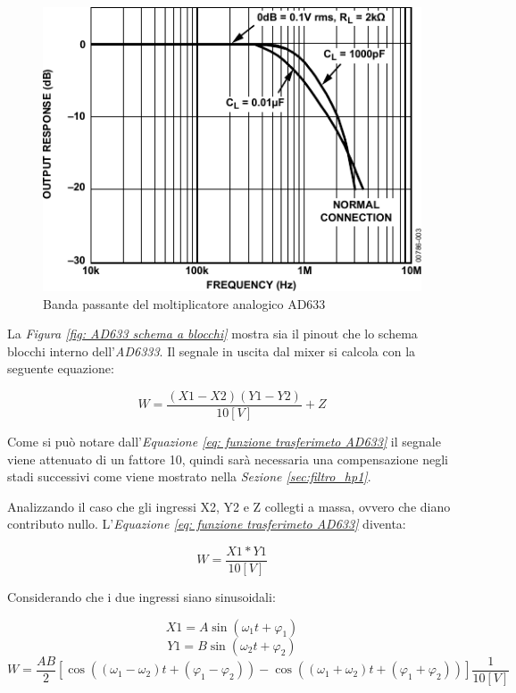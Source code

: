 \documentclass[titlepage]{report}
\begin{document}
	\begin{figure}[H]
		\centering
		\includegraphics[scale=1]{Immagini/ad633_bp.pdf}
		\caption{Banda passante del moltiplicatore analogico AD633}
		\label{fig:sch_ad633}
	\end{figure}

	
	\noindent La \textit{Figura \ref{fig: AD633 schema a blocchi}} mostra sia il pinout che lo schema  blocchi interno dell'\textit{AD6333}. Il segnale in uscita dal mixer si calcola con la seguente equazione:

	\begin{equation}
		\label{eq: funzione trasferimeto AD633}
		W = \frac{(X1 - X2)(Y1 - Y2)}{10 [V]}  + Z 
	\end{equation}

	Come si può notare dall'\textit{Equazione \ref{eq: funzione trasferimeto AD633}} il segnale viene attenuato di un fattore 10, quindi sarà necessaria una compensazione negli stadi successivi come viene mostrato nella \textit{Sezione \ref{sec:filtro_hp1}}. 

	\noindent Analizzando il caso che gli ingressi X2, Y2 e Z collegti a massa, ovvero che diano contributo nullo. L'\textit{Equazione \ref{eq: funzione trasferimeto AD633}} diventa:


	\begin{equation}
		\label{eq: prodotto sinusoidi AD633}
		W = \frac{X1 * Y1}{10 [V]}
	\end{equation}


	Considerando che i due ingressi siano sinusoidali:

	\begin{equation}
		\label{eq: X1 sinusoidale}
		X1 = A\sin (\omega _1t + \varphi _1)
	\end{equation}
	\begin{equation}
		\label{eq: XY sinusoidale}
		Y1 = B\sin (\omega _2t + \varphi _2)
	\end{equation}
	\begin{equation}
		\label{eq:prodotto sinusoidi con fase}
		W = \frac{AB}{2}[\cos ((\omega _1 - \omega _2)t + (\varphi _1 - \varphi _2)) - \cos ((\omega _1 +\omega _2)t + (\varphi _1 + \varphi _2))]\frac{1}{10[V]}
	\end{equation}
\end{document}
